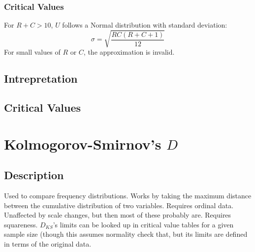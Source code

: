 \documentclass[11pt]{article}
\begin{document}
\subsubsection{Critical Values}
For $R+C > 10$, $U$ follows a Normal distribution with standard deviation:
$$
\sigma = \sqrt{  \frac{  RC(R + C + 1)  }{  12 } }
$$
For small values of $R$ or $C$, the approximation is invalid.

\subsection{Intrepretation}

\subsection{Critical Values}














\section{Kolmogorov-Smirnov's $D$}
\label{section:kolmorogorvsmirnovd}
\subsection{Description}
Used to compare frequency distributions.  
Works by taking the maximum distance between the cumulative distribution of two variables.  
Requires ordinal data.  
Unaffected by scale changes, but then most of these probably are.  
Requires squareness.  
$D_{KS}$'s limits can be looked up in critical value tables for a given sample size (though this assumes normality {\color{red} check that}, but its limits are defined in terms of the original data.

\end{document}
